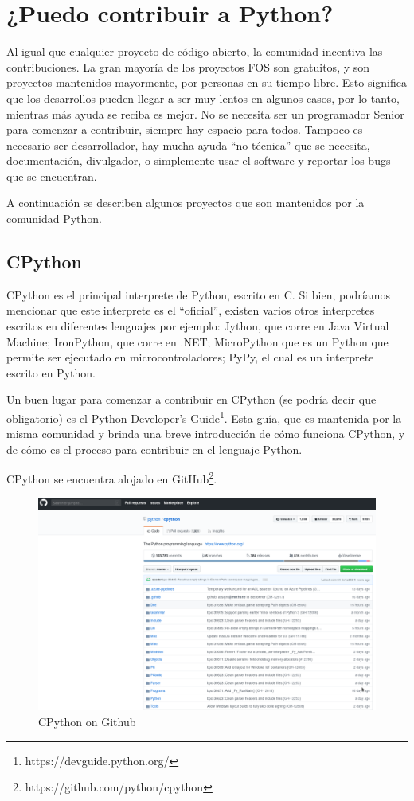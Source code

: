 \documentclass[12pt,a4paper,titlepage]{article}
\begin{document}
\section{¿Puedo contribuir a Python?}
Al igual que cualquier proyecto de código abierto, la comunidad incentiva las contribuciones.
La gran mayoría de los proyectos FOS son gratuitos, y son proyectos mantenidos mayormente,
por personas en su tiempo libre. Esto significa que los desarrollos pueden llegar a ser 
muy lentos en algunos casos, por lo tanto, mientras más ayuda se reciba es mejor. No se
necesita ser un programador Senior para comenzar a contribuir, siempre hay espacio para todos.
Tampoco es necesario ser desarrollador, hay mucha ayuda ``no técnica'' que se necesita,
documentación, divulgador, o simplemente usar el software y reportar los bugs que se encuentran.

A continuación se describen algunos proyectos que son mantenidos por la comunidad Python.

\subsection{CPython}
CPython es el principal interprete de Python, escrito en C. Si bien, podríamos mencionar
que este interprete es el ``oficial'', existen varios otros interpretes escritos en
diferentes lenguajes por ejemplo: Jython, que corre en Java Virtual Machine; IronPython, que 
corre en .NET; MicroPython que es un Python que permite ser ejecutado en microcontroladores;
PyPy, el cual es un interprete escrito en Python.

Un buen lugar para comenzar a contribuir en CPython (se podría decir que obligatorio) es 
el Python Developer's Guide\footnote{https://devguide.python.org/}. Esta guía, que es
mantenida por la misma comunidad y brinda una breve introducción de cómo funciona CPython,
y de cómo es el proceso para contribuir en el lenguaje Python.

CPython se encuentra alojado en GitHub\footnote{https://github.com/python/cpython}.
\\
\begin{figure}[H]
	\centering
	\includegraphics[width=0.7\linewidth]{github}
	\caption[CPython on Github]{CPython on Github}
	\label{fig:github}
\end{figure}
\end{document}
